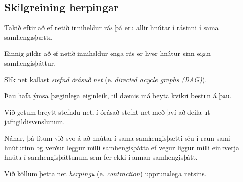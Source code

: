 \subsection{Skilgreining herpingar}
{
	{
		\item<1-> Takið eftir að ef netið inniheldur rás þá eru allir hnútar í rásinni í sama samhengisþætti.
		\item<2-> Einnig gildir að ef netið inniheldur enga rás er hver hnútur sinn eigin samhengisþáttur.
		\item<3-> Slík net kallast \emph{stefnd órásuð net} (e. \emph{directed acycle graphs (DAG)}).
		\item<4-> Þau hafa ýmsa þæginlega eiginleik, til dæmis má beyta kvikri bestun á þau.
		\item<5-> Við getum breytt stefndu neti í órásað stefnt net með því að deila út jafngildisvenslunum.
		\item<6-> Nánar, þá lítum við svo á að hnútar í sama samhengisþætti séu í raun sami hnúturinn
					og verður leggur milli samhengisþátta ef vegur liggur milli einhverja hnúta í samhengisþáttunum sem fer ekki í annan samhengisþátt.
		\item<7-> Við köllum þetta net \emph{herpingu} (e. \emph{contraction}) upprunalega netsins.
	}
}

